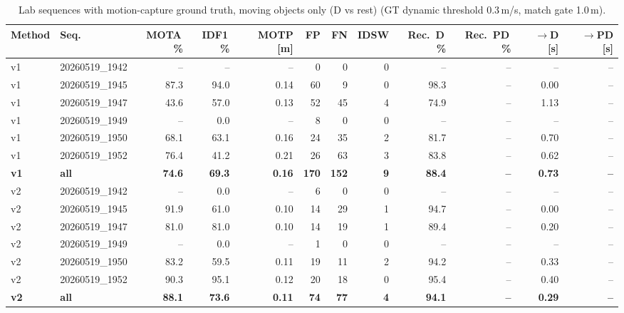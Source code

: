 \begin{table}[t]
\centering
\caption{Lab sequences with motion-capture ground truth, moving objects only (D vs rest) (GT dynamic threshold 0.3\,m/s, match gate 1.0\,m).}
\label{tab:own_mocap_dynamic_only}
\setlength{\tabcolsep}{3pt}
\begin{tabular}{llrrrrrrrrrr}
\toprule
Method & Seq. & MOTA\,\% & IDF1\,\% & MOTP [m] & FP & FN & IDSW & Rec.\ D\,\% & Rec.\ PD\,\% & $\to$D [s] & $\to$PD [s] \\
\midrule
v1 & 20260519\_1942 & -- & -- & -- & 0 & 0 & 0 & -- & -- & -- & -- \\
v1 & 20260519\_1945 & 87.3 & 94.0 & 0.14 & 60 & 9 & 0 & 98.3 & -- & 0.00 & -- \\
v1 & 20260519\_1947 & 43.6 & 57.0 & 0.13 & 52 & 45 & 4 & 74.9 & -- & 1.13 & -- \\
v1 & 20260519\_1949 & -- & 0.0 & -- & 8 & 0 & 0 & -- & -- & -- & -- \\
v1 & 20260519\_1950 & 68.1 & 63.1 & 0.16 & 24 & 35 & 2 & 81.7 & -- & 0.70 & -- \\
v1 & 20260519\_1952 & 76.4 & 41.2 & 0.21 & 26 & 63 & 3 & 83.8 & -- & 0.62 & -- \\
\textbf{v1} & \textbf{all} & \textbf{74.6} & \textbf{69.3} & \textbf{0.16} & \textbf{170} & \textbf{152} & \textbf{9} & \textbf{88.4} & \textbf{--} & \textbf{0.73} & \textbf{--} \\
\midrule
v2 & 20260519\_1942 & -- & 0.0 & -- & 6 & 0 & 0 & -- & -- & -- & -- \\
v2 & 20260519\_1945 & 91.9 & 61.0 & 0.10 & 14 & 29 & 1 & 94.7 & -- & 0.00 & -- \\
v2 & 20260519\_1947 & 81.0 & 81.0 & 0.10 & 14 & 19 & 1 & 89.4 & -- & 0.20 & -- \\
v2 & 20260519\_1949 & -- & 0.0 & -- & 1 & 0 & 0 & -- & -- & -- & -- \\
v2 & 20260519\_1950 & 83.2 & 59.5 & 0.11 & 19 & 11 & 2 & 94.2 & -- & 0.33 & -- \\
v2 & 20260519\_1952 & 90.3 & 95.1 & 0.12 & 20 & 18 & 0 & 95.4 & -- & 0.40 & -- \\
\textbf{v2} & \textbf{all} & \textbf{88.1} & \textbf{73.6} & \textbf{0.11} & \textbf{74} & \textbf{77} & \textbf{4} & \textbf{94.1} & \textbf{--} & \textbf{0.29} & \textbf{--} \\
\bottomrule
\end{tabular}
\end{table}
